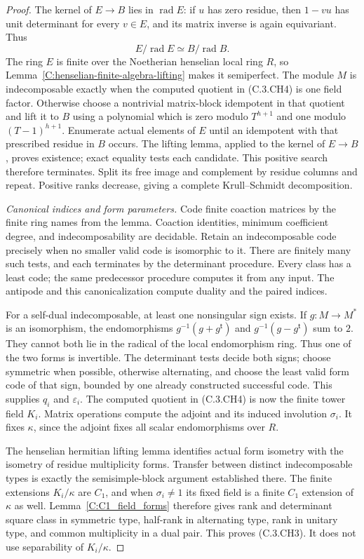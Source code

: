 \begin{proof}
The kernel of $E\to B$ lies in
$\operatorname{rad}E$: if $u$ has zero
residue, then $1-vu$ has unit determinant
for every $v\in E$, and its matrix inverse
is again equivariant.  Thus
\[
 E/\operatorname{rad}E
      \simeq B/\operatorname{rad}B.                       \tag{C.3.CH4}
\]
The ring $E$ is finite over the Noetherian
henselian local ring $R$, so
Lemma~\ref{C:henselian-finite-algebra-lifting}
makes it semiperfect.  The module $M$ is
indecomposable exactly when the computed
quotient in (C.3.CH4) is one field factor.
Otherwise choose a nontrivial matrix-block
idempotent in that quotient and lift it
to $B$ using a polynomial which is zero
modulo $T^{h+1}$ and one modulo
$(T-1)^{h+1}$.
Enumerate actual elements of $E$ until an
idempotent with that prescribed residue
in $B$ occurs.  The lifting lemma, applied
to the kernel of $E\to B$, proves existence;
exact equality tests each candidate.
This positive search therefore terminates.
Split its free image and complement by
residue columns and repeat.  Positive
ranks decrease, giving a complete
Krull--Schmidt decomposition.

\emph{Canonical indices and form parameters.}
Code finite coaction matrices by the finite
ring names from the lemma.  Coaction
identities, minimum coefficient degree,
and indecomposability are decidable.
Retain an indecomposable code precisely
when no smaller valid code is isomorphic
to it.  There are finitely many such
tests, and each terminates by the
determinant procedure.  Every class
has a least code; the same predecessor
procedure computes it from any input.
The antipode and this canonicalization
compute duality and the paired indices.

For a self-dual indecomposable, at least
one nonsingular sign exists.  If
$g:M\to M^*$ is an isomorphism, the
endomorphisms $g^{-1}(g+g^{\mathsf t})$
and $g^{-1}(g-g^{\mathsf t})$ sum to
$2$.  They cannot both lie in the
radical of the local endomorphism ring.
Thus one of the two forms is invertible.
The determinant tests decide both signs;
choose symmetric when possible, otherwise
alternating, and choose the least valid
form code of that sign, bounded by one
already constructed successful code.
This supplies $q_i$ and $\varepsilon_i$.
The computed quotient in (C.3.CH4) is
now the finite tower field $K_i$.
Matrix operations compute the adjoint
and its induced involution $\sigma_i$.
It fixes $\kappa$, since the adjoint
fixes all scalar endomorphisms over $R$.

The henselian hermitian lifting lemma
identifies actual form isometry with
the isometry of residue multiplicity
forms.  Transfer between distinct
indecomposable types is exactly the
semisimple-block argument established
there.  The finite extensions $K_i/\kappa$
are $C_1$, and when $\sigma_i\ne1$
its fixed field is a finite $C_1$
extension of $\kappa$ as well.
Lemma~\ref{C:C1_field_forms} therefore
gives rank and determinant square class
in symmetric type, half-rank in
alternating type, rank in unitary
type, and common multiplicity in a
dual pair.  This proves (C.3.CH3).
It does not use separability of
$K_i/\kappa$.


\end{proof}
